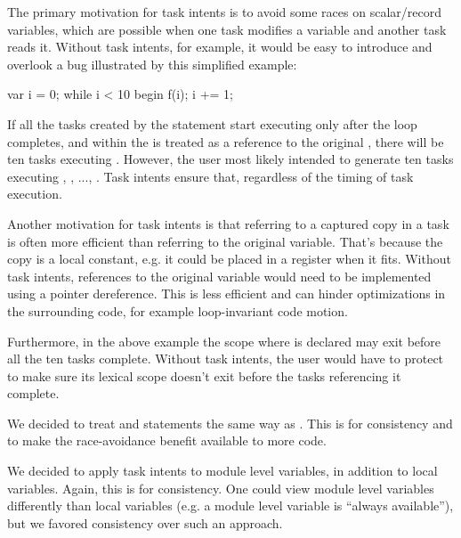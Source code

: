 \begin{rationale}
The primary motivation for task intents is to avoid some races on
scalar/record variables, which are possible when one task modifies a
variable and another task reads it. Without task intents,
for example, it would be easy to introduce and overlook a bug
illustrated by this simplified example:

  \begin{chapel}
  {
    var i = 0;
    while i < 10 {
      begin {
        f(i);
      }
      i += 1;
    }
  }
  \end{chapel}

If all the tasks created by the  statement start executing
only after the  loop completes, and  within the
 is treated as a reference to the original ,
there will be ten tasks executing . However, the user most
likely intended to generate ten tasks executing
, , ..., .
Task intents ensure that, regardless of the timing of task execution.

Another motivation for task intents is that referring to a captured
copy in a task is often more efficient than referring to the original
variable. That's because the copy is a local constant, e.g. it could
be placed in a register when it fits.  Without task intents,
references to the original variable would need to be implemented using
a pointer dereference. This is less efficient and can hinder optimizations
in the surrounding code, for example loop-invariant code motion.

Furthermore, in the above example the scope where  is declared
may exit before all the ten tasks complete.  Without task intents,
the user would have to protect  to make sure its lexical scope
doesn't exit before the tasks referencing it complete.

We decided to treat  and  statements the
same way as . This is for consistency and to make the
race-avoidance benefit available to more code.

We decided to apply task intents to module level variables, in addition
to local variables. Again, this is for consistency. One could view module
level variables differently than local variables (e.g. a module level 
variable is ``always available''), but we favored consistency over such
an approach.


\end{rationale}
